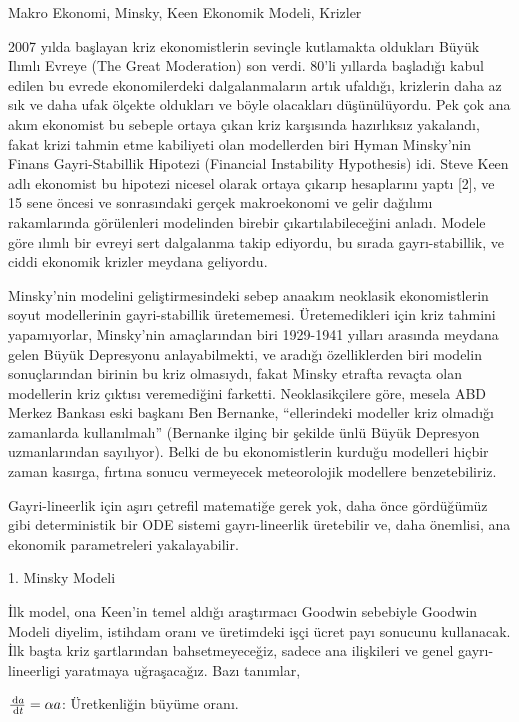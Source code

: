 \documentclass[12pt,fleqn]{article}\usepackage{../../common}
\begin{document}
Makro Ekonomi, Minsky, Keen Ekonomik Modeli, Krizler

2007 yılda başlayan kriz ekonomistlerin sevinçle kutlamakta oldukları Büyük
Ilımlı Evreye (The Great Moderation) son verdi. 80'li yıllarda başladığı
kabul edilen bu evrede ekonomilerdeki dalgalanmaların artık ufaldığı,
krizlerin daha az sık ve daha ufak ölçekte oldukları ve böyle olacakları
düşünülüyordu. Pek çok ana akım ekonomist bu sebeple ortaya çıkan kriz
karşısında hazırlıksız yakalandı, fakat krizi tahmin etme kabiliyeti olan
modellerden biri Hyman Minsky'nin Finans Gayri-Stabillik Hipotezi
(Financial Instability Hypothesis) idi. Steve Keen adlı ekonomist bu
hipotezi nicesel olarak ortaya çıkarıp hesaplarını yaptı [2], ve 15 sene
öncesi ve sonrasındaki gerçek makroekonomi ve gelir dağılımı rakamlarında
görülenleri modelinden birebir çıkartılabileceğini anladı. Modele göre
ılımlı bir evreyi sert dalgalanma takip ediyordu, bu sırada
gayrı-stabillik, ve ciddi ekonomik krizler meydana geliyordu.

Minsky'nin modelini geliştirmesindeki sebep anaakım neoklasik ekonomistlerin
soyut modellerinin gayri-stabillik üretememesi. Üretemedikleri için kriz tahmini
yapamıyorlar, Minsky'nin amaçlarından biri 1929-1941 yılları arasında meydana
gelen Büyük Depresyonu anlayabilmekti, ve aradığı özelliklerden biri modelin
sonuçlarından birinin bu kriz olmasıydı, fakat Minsky etrafta revaçta olan
modellerin kriz çıktısı veremediğini farketti.  Neoklasikçilere göre, mesela ABD
Merkez Bankası eski başkanı Ben Bernanke, ``ellerindeki modeller kriz olmadığı
zamanlarda kullanılmalı'' (Bernanke ilginç bir şekilde ünlü Büyük Depresyon
uzmanlarından sayılıyor). Belki de bu ekonomistlerin kurduğu modelleri hiçbir
zaman kasırga, fırtına sonucu vermeyecek meteorolojik modellere benzetebiliriz.

Gayri-lineerlik için aşırı çetrefil matematiğe gerek yok, daha önce gördüğümüz
gibi deterministik bir ODE sistemi gayrı-lineerlik üretebilir ve, daha önemlisi,
ana ekonomik parametreleri yakalayabilir.

1. Minsky Modeli

İlk model, ona Keen'in temel aldığı araştırmacı Goodwin sebebiyle Goodwin
Modeli diyelim, istihdam oranı ve üretimdeki işçi ücret payı sonucunu
kullanacak. İlk başta kriz şartlarından bahsetmeyeceğiz, sadece ana
ilişkileri ve genel gayrı-lineerligi yaratmaya uğraşacağız. Bazı tanımlar,

$\frac{\,\mathrm{d} a}{\,\mathrm{d} t} = \alpha a$: Üretkenliğin büyüme oranı.
\end{document}
